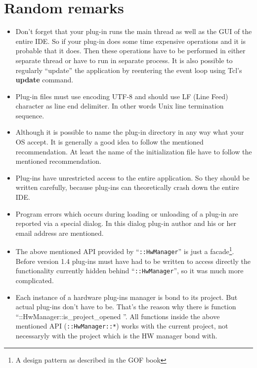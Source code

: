 \documentclass[a4paper,twoside,12pt]{book}
\begin{document}
	\section{Random remarks}
		\begin{itemize}
			\item Don't forget that your plug-in runs the main thread as well as the GUI of the entire IDE. So if your plug-in does some time expensive operations and it is probable that it does. Then these operations have to be performed in either separate thread or have to run in separate process. It is also possible to regularly ``update'' the application by reentering the event loop using Tcl's \textbf{update} command.
			\item Plug-in files must use encoding UTF-8 and should use LF (Line Feed) character as line end delimiter. In other words Unix line termination sequence.
			\item Although it is possible to name the plug-in directory in any way what your OS accept. It is generally a good idea to follow the mentioned recommendation. At least the name of the initialization file have to follow the mentioned recommendation.
			\item Plug-ins have unrestricted access to the entire application. So they should be written carefully, because plug-ins can theoretically crash down the entire IDE.
			\item Program errors which occurs during loading or unloading of a plug-in are reported via a special dialog. In this dialog plug-in author and his or her email address are mentioned.
			\item The above mentioned API provided by ``\texttt{::HwManager}'' is just a facade\footnote{A design pattern as described in the GOF book}. Before version 1.4 plug-ins must have had to be written to access directly the functionality currently hidden behind ``\texttt{::HwManager}'', so it was much more complicated.
			\item Each instance of a hardware plug-ins manager is bond to its project. But actual plug-ins don't have to be. That's the reason why there is function ``::HwManager::is\_project\_opened {}''. All functions inside the above mentioned API (\texttt{::HwManager::*}) works with the current project, not necessaryly with the project which is the HW manager bond with.
		\end{itemize}
\end{document}
